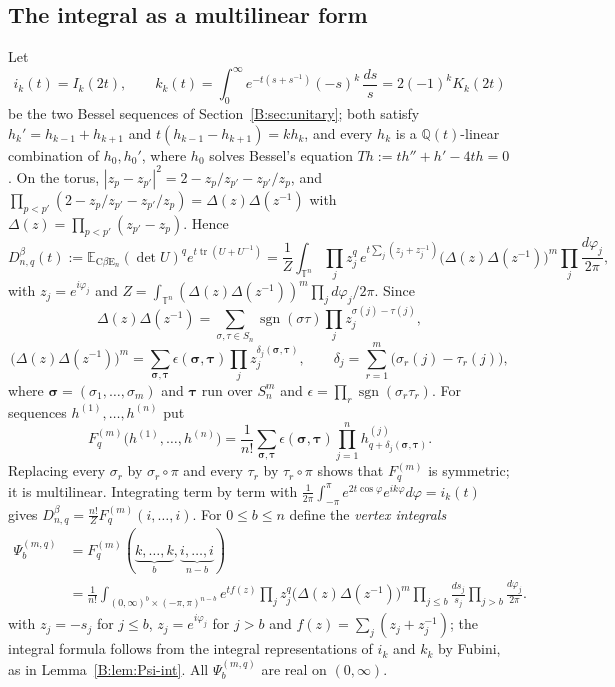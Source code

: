 \documentclass[11pt,a4paper]{article}
\theoremstyle{definition}
\theoremstyle{remark}
\newcommand{\Q}{\mathbb Q}
\newcommand{\T}{\mathbb T}
\newcommand{\E}{\mathbb E}
\DeclareMathOperator{\sgn}{sgn}
\DeclareMathOperator{\tr}{tr}
\numberwithin{equation}{section}
\begin{document}
\subsection{The integral as a multilinear form}
Let
\[
i_k(t)=I_k(2t),\qquad k_k(t)=\int_0^\infty e^{-t(s+s^{-1})}(-s)^k\,\frac{ds}s=2(-1)^kK_k(2t)
\]
be the two Bessel sequences of Section~\ref{B:sec:unitary}; both satisfy $h_k'=h_{k-1}+h_{k+1}$ and $t(h_{k-1}-h_{k+1})=kh_k$, and every $h_k$ is a $\Q(t)$-linear combination of $h_0,h_0'$, where $h_0$ solves Bessel's equation $Th:=th''+h'-4th=0$. On the torus, $|z_p-z_{p'}|^2=2-z_p/z_{p'}-z_{p'}/z_p$, and $\prod_{p<p'}(2-z_p/z_{p'}-z_{p'}/z_p)=\Delta(z)\Delta(z^{-1})$ with $\Delta(z)=\prod_{p<p'}(z_{p'}-z_p)$. Hence
\[
D^\beta_{n,q}(t):=\E_{\mathrm{C}\beta\mathrm{E}_n}(\det U)^qe^{t\tr(U+U^{-1})}=\frac1{Z}\int_{\T^n}\prod_jz_j^q\,e^{t\sum_j(z_j+z_j^{-1})}\bigl(\Delta(z)\Delta(z^{-1})\bigr)^m\prod_j\frac{d\varphi_j}{2\pi},
\]
with $z_j=e^{i\varphi_j}$ and $Z=\int_{\T^n}(\Delta(z)\Delta(z^{-1}))^m\prod_jd\varphi_j/2\pi$. Since
\[
\Delta(z)\Delta(z^{-1})=\sum_{\sigma,\tau\in S_n}\sgn(\sigma\tau)\prod_jz_j^{\sigma(j)-\tau(j)},
\]
\[
\bigl(\Delta(z)\Delta(z^{-1})\bigr)^m=\sum_{\boldsymbol\sigma,\boldsymbol\tau}\epsilon(\boldsymbol\sigma,\boldsymbol\tau)\prod_jz_j^{\delta_j(\boldsymbol\sigma,\boldsymbol\tau)},\qquad\delta_j=\sum_{r=1}^m\bigl(\sigma_r(j)-\tau_r(j)\bigr),
\]
where $\boldsymbol\sigma=(\sigma_1,\dots,\sigma_m)$ and $\boldsymbol\tau$ run over $S_n^m$ and $\epsilon=\prod_r\sgn(\sigma_r\tau_r)$. For sequences $h^{(1)},\dots,h^{(n)}$ put
\[
F^{(m)}_q\bigl(h^{(1)},\dots,h^{(n)}\bigr)=\frac1{n!}\sum_{\boldsymbol\sigma,\boldsymbol\tau}\epsilon(\boldsymbol\sigma,\boldsymbol\tau)\prod_{j=1}^nh^{(j)}_{q+\delta_j(\boldsymbol\sigma,\boldsymbol\tau)} .
\]
Replacing every $\sigma_r$ by $\sigma_r\circ\pi$ and every $\tau_r$ by $\tau_r\circ\pi$ shows that $F^{(m)}_q$ is symmetric; it is multilinear. Integrating term by term with $\frac1{2\pi}\int_{-\pi}^{\pi}e^{2t\cos\varphi}e^{ik\varphi}d\varphi=i_k(t)$ gives $D^\beta_{n,q}=\frac{n!}ZF^{(m)}_q(i,\dots,i)$. For $0\le b\le n$ define the \emph{vertex integrals}
\[
\begin{aligned}\Psi^{(m,q)}_b&=F^{(m)}_q(\underbrace{k,\dots,k}_{b},\underbrace{i,\dots,i}_{n-b})\\
&=\frac1{n!}\int_{(0,\infty)^b\times(-\pi,\pi)^{n-b}}e^{tf(z)}\prod_jz_j^q\bigl(\Delta(z)\Delta(z^{-1})\bigr)^m\prod_{j\le b}\frac{ds_j}{s_j}\prod_{j>b}\frac{d\varphi_j}{2\pi}.\end{aligned}
\]
with $z_j=-s_j$ for $j\le b$, $z_j=e^{i\varphi_j}$ for $j>b$ and $f(z)=\sum_j(z_j+z_j^{-1})$; the integral formula follows from the integral representations of $i_k$ and $k_k$ by Fubini, as in Lemma~\ref{B:lem:Psi-int}. All $\Psi^{(m,q)}_b$ are real on $(0,\infty)$.
\end{document}
